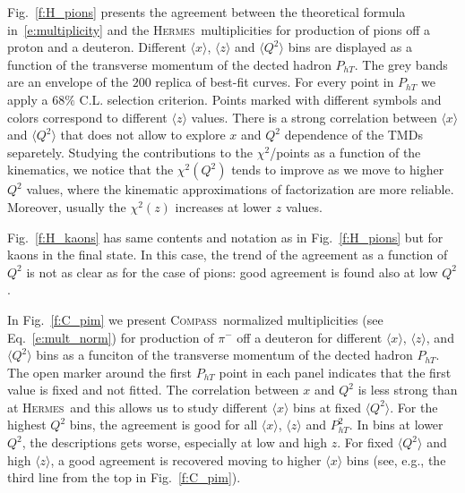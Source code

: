 \documentclass[aps,preprintnumbers,showpacs,nofootinbib,superscriptaddress,floatfix]{revtex4}
\newcommand{\AS}[1]{{\textcolor[rgb]{1,0,1}{#1}}}
\newcommand{\hermes}{\textsc{Hermes}}
\newcommand{\compass}{\textsc{Compass}}
\begin{document}
Fig.~\ref{f:H_pions} presents the agreement between the theoretical formula in~\eqref{e:multiplicity} and the \hermes\ multiplicities for production of pions off a proton and a deuteron. 
Different $\langle x \rangle$, $\langle z \rangle$ and $\langle Q^2 \rangle$
bins are displayed as a function 
of the transverse momentum of the dected hadron $P_{hT}$.
The grey bands are an envelope of the $200$ replica of best-fit curves. For every point in $P_{hT}$ we apply a $68\%$ C.L. selection criterion. 
Points marked with different symbols and colors correspond to different $\langle z \rangle$ values. There is a strong correlation between $\langle x \rangle$ and $\langle Q^2 \rangle$ that does not allow to explore $x$ and $Q^2$ dependence of the TMDs separetely. 
Studying the contributions to the $\chi^2$/points as a function of the kinematics,  
we notice that the $\chi^2(Q^2)$ 
tends to improve as we move to higher $Q^2$ values, where the kinematic approximations of factorization are more reliable. 
Moreover, usually the $\chi^2(z)$ increases at lower $z$ values.

Fig.~\ref{f:H_kaons} has same contents and notation as in Fig.~\ref{f:H_pions}
but for kaons in the final state. In this case, the trend of the agreement as
a function of $Q^2$ is not as clear as for the case of pions: good agreement
is found also at low $Q^2$.

In Fig.~\ref{f:C_pim} we present \compass\ normalized multiplicities (see
Eq.~\eqref{e:mult_norm}) for production of $\pi^-$ off a deuteron for
different $\langle x \rangle$, $\langle z \rangle$, and $\langle Q^2 \rangle$
bins as a funciton of the transverse momentum of the dected hadron
$P_{hT}$. The open marker around the first $P_{hT}$ point in each panel indicates that the first value is fixed and not fitted. 
The correlation between $x$ and $Q^2$ is less strong than at \hermes\ and this
allows us to study different $\langle x \rangle$ bins at fixed $\langle Q^2 \rangle$.
For the highest $Q^2$ bins, the agreement is good for all $\langle x \rangle$, $\langle z \rangle$ and $P_{hT}^2$. 
In bins at lower $Q^2$, the descriptions gets worse, especially at low and
high $z$. 
For fixed $\langle Q^2 \rangle$ and high $\langle z \rangle$, a good agreement
is recovered moving to higher $\langle x \rangle$ bins (see, e.g., the
  third line from the top in Fig.~\ref{f:C_pim}).
\end{document}
